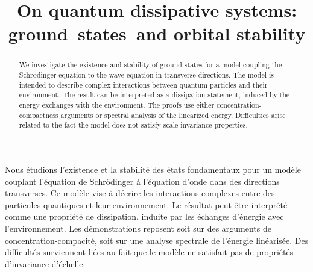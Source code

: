 \documentclass[JEP,XML,SOM,NoEqCountersInSection,NoFloatCountersInSection,Unicode,published]{cedram}
\theoremstyle{definition}
\begin{document}
\title{On quantum dissipative systems: ground~states~and orbital stability}

\author[\initial{T.} \lastname{Goudon}]{ }
\address{Université Côte d'Azur, Inria, CNRS, LJAD\\
Parc Valrose, F-06108 Nice, France}

\author[\initial{L.} \lastname{Vivion}]{ }
\address{Université Côte d'Azur, Inria, CNRS, LJAD\\
Parc Valrose, F-06108 Nice, France}

\begin{abstract}
We investigate the existence and stability of ground states for a model coupling the Schrödinger equation to the wave equation in transverse directions. The model is intended to describe complex interactions between quantum particles and their environment. The result can be interpreted as a dissipation statement, induced by the energy exchanges with the environment. The proofs use either concentration-compactness arguments or spectral analysis of the linearized energy. Difficulties arise related to the fact the model does not satisfy scale invariance properties.
\end{abstract}





\begin{altabstract}
Nous étudions l'existence et la stabilité des états fondamentaux pour un modèle couplant l'équation de Schrödinger à l'équation d'onde dans des directions transverses. Ce modèle vise à décrire les interactions complexes entre des particules quantiques et leur environnement. Le résultat peut être interprété comme une propriété de dissipation, induite par les échanges d'énergie avec l'environnement. Les démonstrations reposent soit sur des arguments de concentration-compacité, soit sur une analyse spectrale de l'énergie linéarisée. Des difficultés surviennent liées au fait que le modèle ne satisfait pas de propriétés d'invariance d'échelle.
\end{altabstract}
\maketitle
\end{document}
